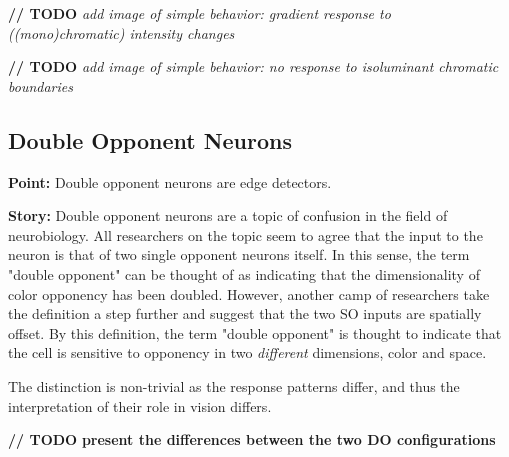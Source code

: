 \documentclass[journal,onecolumn]{IEEEtran}
\begin{document}
\textbf{// TODO} \textit{add image of simple behavior: gradient response to ((mono)chromatic) intensity changes}

\textbf{// TODO} \textit{add image of simple behavior: no response to isoluminant chromatic boundaries}

\subsection*{Double Opponent Neurons}

\textbf{Point:}
Double opponent neurons are edge detectors. 

\textbf{Story:}
Double opponent neurons are a topic of confusion in the field of neurobiology. All researchers on the topic seem to agree that the input to the neuron is that of two single opponent neurons itself. In this sense, the term "double opponent" can be thought of as indicating that the dimensionality of color opponency has been doubled. However, another camp of researchers take the definition a step further and suggest that the two SO inputs are spatially offset. By this definition, the term "double opponent" is thought to indicate that the cell is sensitive to opponency in two \textit{different} dimensions, color and space.

The distinction is non-trivial as the response patterns differ, and thus the interpretation of their role in vision differs.

\textbf{// TODO} \textbf{present the differences between the two DO configurations}
\end{document}
